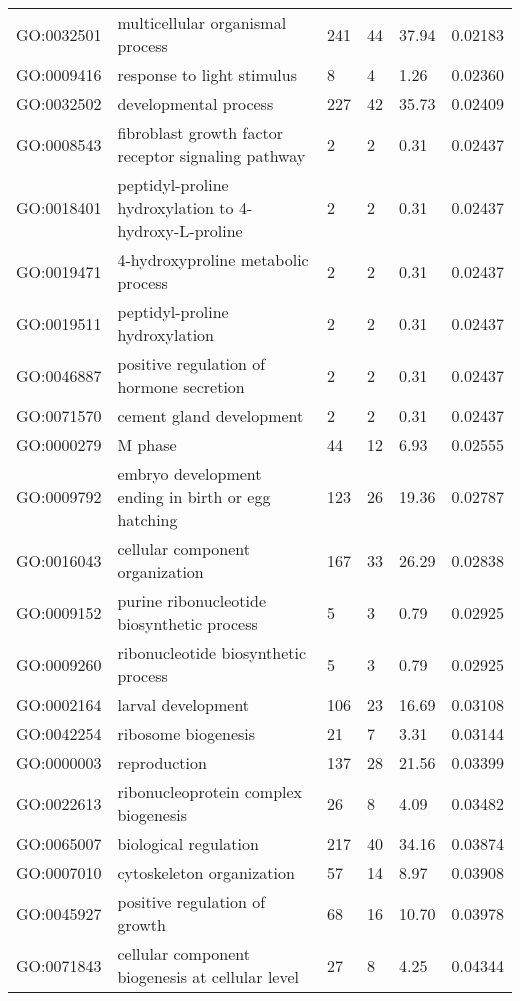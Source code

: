\documentclass[10pt]{bmc_article}
\newenvironment{bmcformat}{\begin{raggedright}\baselineskip20pt\sloppy\setboolean{publ}{false}}{\end{raggedright}\baselineskip20pt\sloppy}
\begin{document}
\begin{bmcformat}
\begin{longtable}{lp{3cm}llll}
  GO:0032501 & multicellular organismal process & 241 &  44 & 37.94 & 0.02183 \\ 
  GO:0009416 & response to light stimulus &   8 &   4 & 1.26 & 0.02360 \\ 
  GO:0032502 & developmental process & 227 &  42 & 35.73 & 0.02409 \\ 
  GO:0008543 & fibroblast growth factor receptor signaling pathway &   2 &   2 & 0.31 & 0.02437 \\ 
  GO:0018401 & peptidyl-proline hydroxylation to 4-hydroxy-L-proline &   2 &   2 & 0.31 & 0.02437 \\ 
  GO:0019471 & 4-hydroxyproline metabolic process &   2 &   2 & 0.31 & 0.02437 \\ 
  GO:0019511 & peptidyl-proline hydroxylation &   2 &   2 & 0.31 & 0.02437 \\ 
  GO:0046887 & positive regulation of hormone secretion &   2 &   2 & 0.31 & 0.02437 \\ 
  GO:0071570 & cement gland development &   2 &   2 & 0.31 & 0.02437 \\ 
  GO:0000279 & M phase &  44 &  12 & 6.93 & 0.02555 \\ 
  GO:0009792 & embryo development ending in birth or egg hatching & 123 &  26 & 19.36 & 0.02787 \\ 
  GO:0016043 & cellular component organization & 167 &  33 & 26.29 & 0.02838 \\ 
  GO:0009152 & purine ribonucleotide biosynthetic process &   5 &   3 & 0.79 & 0.02925 \\ 
  GO:0009260 & ribonucleotide biosynthetic process &   5 &   3 & 0.79 & 0.02925 \\ 
  GO:0002164 & larval development & 106 &  23 & 16.69 & 0.03108 \\ 
  GO:0042254 & ribosome biogenesis &  21 &   7 & 3.31 & 0.03144 \\ 
  GO:0000003 & reproduction & 137 &  28 & 21.56 & 0.03399 \\ 
  GO:0022613 & ribonucleoprotein complex biogenesis &  26 &   8 & 4.09 & 0.03482 \\ 
  GO:0065007 & biological regulation & 217 &  40 & 34.16 & 0.03874 \\ 
  GO:0007010 & cytoskeleton organization &  57 &  14 & 8.97 & 0.03908 \\ 
  GO:0045927 & positive regulation of growth &  68 &  16 & 10.70 & 0.03978 \\ 
  GO:0071843 & cellular component biogenesis at cellular level &  27 &   8 & 4.25 & 0.04344 \\ 

\end{longtable}
\end{bmcformat}
\end{document}
